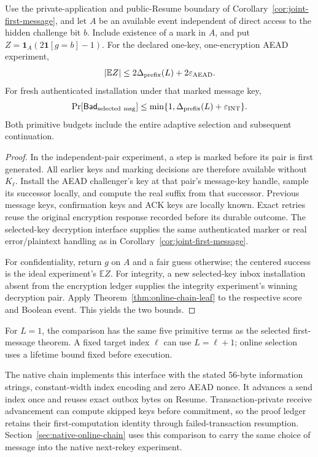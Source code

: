 \begin{corollary}
\label{cor:online-chain-message}
Use the private-application and public-Resume boundary of
Corollary~\ref{cor:joint-first-message}, and let $A$ be an available
event independent of direct access to the hidden challenge bit $b$.
Include existence of a mark in $A$, and put
$Z=\mathbf1_A(2\mathbf1[g=b]-1)$. For the declared one-key,
one-encryption AEAD experiment,
\[
 |\mathbb E Z|\le
  2\Delta_{\rm prefix}(L)+2\varepsilon_{\rm AEAD}.
\]
For fresh authenticated installation under that marked message key,
\[
 \Pr[\mathsf{Bad}_{\rm selected\ msg}]
 \le\min\{1,\Delta_{\rm prefix}(L)+\varepsilon_{\rm INT}\}.
\]
Both primitive budgets include the entire adaptive selection and
subsequent continuation.
\end{corollary}
\begin{proof}
In the independent-pair experiment, a step is marked before its pair
is first generated. All earlier keys and marking decisions are
therefore available without $K_\ell$. Install the AEAD challenger's
key at that pair's message-key handle, sample its successor locally,
and compute the real suffix from that successor. Previous message
keys, confirmation keys and ACK keys are locally known. Exact retries
reuse the original encryption response recorded before its durable
outcome. The selected-key decryption interface supplies the same
authenticated marker or real error/plaintext handling as in
Corollary~\ref{cor:joint-first-message}.

For confidentiality, return $g$ on $A$ and a fair guess otherwise;
the centered success is the ideal experiment's $\mathbb E Z$.
For integrity, a new selected-key inbox installation absent from
the encryption ledger supplies the integrity experiment's winning
decryption pair. Apply Theorem~\ref{thm:online-chain-leaf} to the
respective score and Boolean event. This yields the two bounds.
\end{proof}

For $L=1$, the comparison has the same five primitive terms as
the selected first-message theorem. A fixed target index $\ell$
can use $L=\ell+1$; online selection uses a lifetime bound fixed
before execution.

The native chain implements this interface with the stated 56-byte
information strings, constant-width index encoding and zero AEAD nonce.
It advances a send index once and reuses exact outbox bytes on Resume.
Transaction-private receive advancement can compute skipped keys before
commitment, so the proof ledger retains their first-computation identity
through failed-transaction resumption.
Section~\ref{sec:native-online-chain} uses this comparison to carry the
same choice of message into the native next-rekey experiment.

